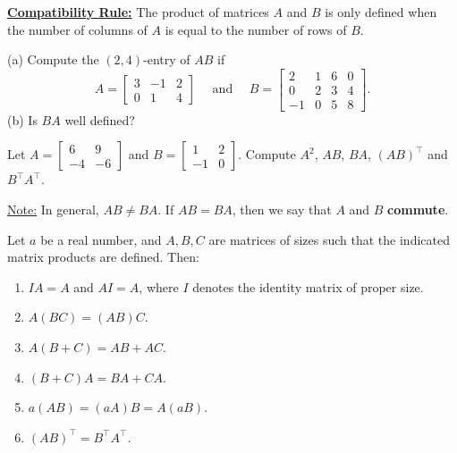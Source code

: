 \documentclass[20pt,a4paper]{extarticle}
\newcounter{example}[section]
\newcounter{theorem}
\begin{document}
\begin{solution}

\end{solution}

\vfill 

\underline{\textbf{Compatibility Rule:}} The product of matrices $A$ and $B$ is only defined when the number of columns of $A$ is equal to the number of rows of $B$.

\newpage 

\begin{example}
(a) Compute the $(2, 4)$-entry of $AB$ if
	\[
		A = \begin{bmatrix} 3 & -1 & 2 \\ 0 & 1 & 4 \end{bmatrix} \quad \text{ and } \quad B = \begin{bmatrix} 2 & 1 & 6 & 0 \\ 0 & 2 & 3 & 4 \\ -1 & 0 & 5 & 8 \end{bmatrix} .
	\]
(b) Is $BA$ well defined?
\end{example}

\begin{solution}

\end{solution}

\newpage 

\begin{example}
Let $A = \begin{bmatrix} 6 & 9 \\ -4 & -6 \end{bmatrix}$ and $B = \begin{bmatrix} 1 & 2 \\ -1 & 0 \end{bmatrix}$. Compute $A^2$, $AB$, $BA$, $(AB)^\top$ and $B^\top A^\top$. 
\end{example}

\begin{solution}

\end{solution}

\vfill 

\underline{Note:} In general, $AB \neq BA$. If $AB = BA$, then we say that $A$ and $B$ \textbf{commute}.

\newpage 

\begin{theorem}
Let $a$ be a real number, and $A, B, C$ are matrices of sizes such that the indicated matrix products are defined. Then:
	\begin{enumerate}[label=\arabic*)]
		\item $IA = A$ and $AI = A$, where $I$ denotes the identity matrix of proper size.
		\item $A (BC) = (AB) C$.
		\item $A (B + C) = AB + AC$.
		\item $(B + C) A = BA + CA$.
		\item $a (AB) = (aA)B = A (aB)$.
		\item $(AB)^{\top} = B^\top A^\top$.
	\end{enumerate}
\end{theorem}
\end{document}
